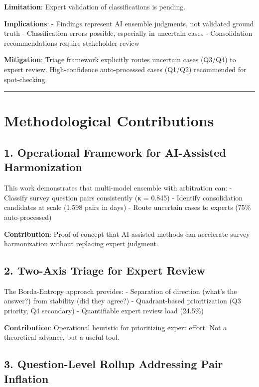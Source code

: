 \documentclass[
  letterpaper,
]{report}
\begin{document}
\textbf{Limitation}: Expert validation of classifications is pending.

\textbf{Implications}: - Findings represent AI ensemble judgments, not
validated ground truth - Classification errors possible, especially in
uncertain cases - Consolidation recommendations require stakeholder
review

\textbf{Mitigation}: Triage framework explicitly routes uncertain cases
(Q3/Q4) to expert review. High-confidence auto-processed cases (Q1/Q2)
recommended for spot-checking.

\begin{center}\rule{0.5\linewidth}{0.5pt}\end{center}

\section{Methodological
Contributions}\label{methodological-contributions}

\subsection{1. Operational Framework for AI-Assisted
Harmonization}\label{operational-framework-for-ai-assisted-harmonization}

This work demonstrates that multi-model ensemble with arbitration can: -
Classify survey question pairs consistently (κ = 0.845) - Identify
consolidation candidates at scale (1,598 pairs in days) - Route
uncertain cases to experts (75\% auto-processed)

\textbf{Contribution}: Proof-of-concept that AI-assisted methods can
accelerate survey harmonization without replacing expert judgment.

\subsection{2. Two-Axis Triage for Expert
Review}\label{two-axis-triage-for-expert-review}

The Borda-Entropy approach provides: - Separation of direction (what's
the answer?) from stability (did they agree?) - Quadrant-based
prioritization (Q3 priority, Q4 secondary) - Quantifiable expert review
load (24.5\%)

\textbf{Contribution}: Operational heuristic for prioritizing expert
effort. Not a theoretical advance, but a useful tool.

\subsection{3. Question-Level Rollup Addressing Pair
Inflation}\label{question-level-rollup-addressing-pair-inflation}
\end{document}
